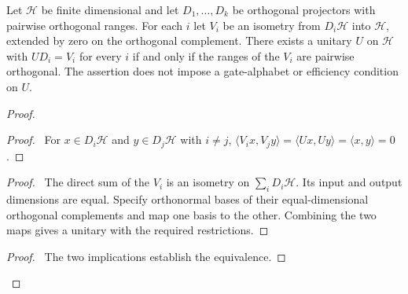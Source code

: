 \begin{lemma}\label{lem:tB-extension}
Let $\mathcal H$ be finite dimensional and let $D_1,\ldots,D_k$ be
orthogonal projectors with pairwise orthogonal ranges. For each $i$ let
$V_i$ be an isometry from $D_i\mathcal H$ into $\mathcal H$, extended
by zero on the orthogonal complement. There exists a unitary $U$ on
$\mathcal H$ with $UD_i=V_i$ for every $i$ if and only if the ranges
of the $V_i$ are pairwise orthogonal. The assertion does not impose a
gate-alphabet or efficiency condition on $U$.
\end{lemma}
\begin{proof}
 \begin{proof}\pf\ For $x\in D_i\mathcal H$ and
 $y\in D_j\mathcal H$ with $i\ne j$,
 $\langle V_ix,V_jy\rangle=\langle Ux,Uy\rangle
 =\langle x,y\rangle=0$.\end{proof}
 \begin{proof}\pf\ The direct sum of the $V_i$ is an isometry on
 $\sum_iD_i\mathcal H$. Its input and output dimensions are equal.
 Specify orthonormal bases of their equal-dimensional orthogonal
 complements and map one basis to the other. Combining the two maps
 gives a unitary with the required restrictions.\end{proof}
 \qedstep
 \begin{proof}\pf\ The two implications establish the equivalence.
 \end{proof}
\end{proof}

